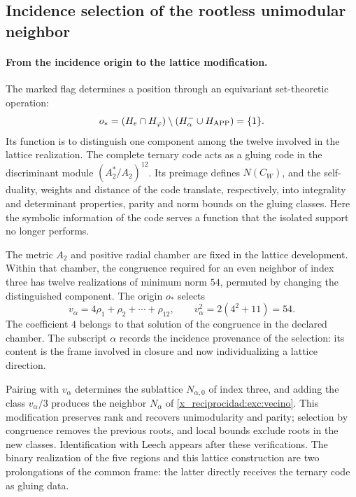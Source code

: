 \subsection{Incidence selection of the rootless unimodular neighbor}
\label{x_reciprocidad:exc:leech}


\paragraph{From the incidence origin to the lattice modification.}
\label{x_reciprocidad:inc-ampl-reticulo}
The marked flag determines a position through an equivariant
set-theoretic operation:
\[
 o_*=(H_e\cap H_\varphi)
       \setminus(H^-_\alpha\cup H_{\rm APP})=\{1\}.
\]
Its function is to distinguish one component among the twelve
involved in the lattice realization. The complete ternary code
acts as a gluing code in the discriminant module
$(A_2^*/A_2)^{12}$. Its preimage defines $N(C_W)$, and the
self-duality, weights and distance of the code translate,
respectively, into integrality and determinant properties, parity
and norm bounds on the gluing classes. Here the symbolic information
of the code serves a function that the isolated support no longer performs.

The metric $A_2$ and positive radial chamber are fixed in the lattice
development. Within that chamber, the congruence required for an even
neighbor of index three has twelve realizations of minimum norm $54$,
permuted by changing the distinguished component. The origin $o_*$
selects
\[
 v_\alpha=4\rho_1+\rho_2+\cdots+\rho_{12},\qquad
 v_\alpha^2=2(4^2+11)=54.
\]
The coefficient $4$ belongs to that solution of the congruence in the
declared chamber. The subscript $\alpha$ records the incidence
provenance of the selection: its content is the frame involved in
closure and now individualizing a lattice direction.

Pairing with $v_\alpha$ determines the sublattice
$N_{\alpha,0}$ of index three, and adding the class
$v_\alpha/3$ produces the neighbor $N_\alpha$ of
\eqref{x_reciprocidad:exc:vecino}. This modification preserves rank and recovers
unimodularity and parity; selection by congruence removes the previous roots,
and local bounds exclude roots in the new classes.
Identification with Leech appears after these verifications. The
binary realization of the five regions and this lattice construction
are two prolongations of the common frame: the latter directly receives
the ternary code as gluing data.


